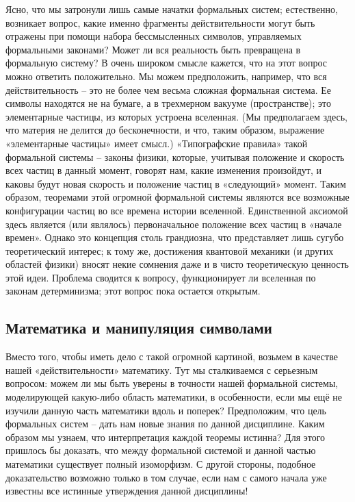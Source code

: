 \documentclass[../main.tex]{subfiles}
\begin{document}
Ясно, что мы затронули лишь самые начатки формальных систем; естественно, возникает вопрос, какие именно фрагменты действительности могут быть отражены при помощи набора бессмысленных символов, управляемых формальными законами?
Может ли вся реальность быть превращена в формальную систему?
В очень широком смысле кажется, что на этот вопрос можно ответить положительно.
Мы можем предположить, например, что вся действительность \--- это не более чем весьма сложная формальная система.
Ее символы находятся не на бумаге, а в трехмерном вакууме (пространстве); это элементарные частицы, из которых устроена вселенная.
(Мы предполагаем здесь, что материя не делится до бесконечности, и что, таким образом, выражение «элементарные частицы» имеет смысл.)
«Типографские правила» такой формальной системы \--- законы физики, которые, учитывая положение и скорость всех частиц в данный момент, говорят нам, какие изменения произойдут, и каковы будут новая скорость и положение частиц в «следующий» момент. Таким образом, теоремами этой огромной формальной системы являются все возможные конфигурации частиц во все времена истории вселенной. Единственной аксиомой здесь является (или являлось) первоначальное положение всех частиц в «начале времен».
Однако это концепция столь грандиозна, что представляет лишь сугубо теоретический интерес; к тому же, достижения квантовой механики (и других областей физики) вносят некие сомнения даже и в чисто теоретическую ценность этой идеи.
Проблема сводится к вопросу, функционирует ли вселенная по законам детерминизма; этот вопрос пока остается открытым.


\subsection{Математика и манипуляция символами}

Вместо того, чтобы иметь дело с такой огромной картиной, возьмем в качестве нашей «действительности» математику. Тут мы сталкиваемся с серьезным вопросом: можем ли мы быть уверены в точности нашей формальной системы, моделирующей какую-либо область математики, в особенности, если мы ещё не изучили данную часть математики вдоль и поперек? Предположим, что цель формальных систем \--- дать нам новые знания по данной дисциплине. Каким образом мы узнаем, что интерпретация каждой теоремы истинна? Для этого пришлось бы доказать, что между формальной системой и данной частью математики существует полный изоморфизм. С другой стороны, подобное доказательство возможно только в том случае, если нам с самого начала уже известны все истинные утверждения данной дисциплины!
\end{document}
